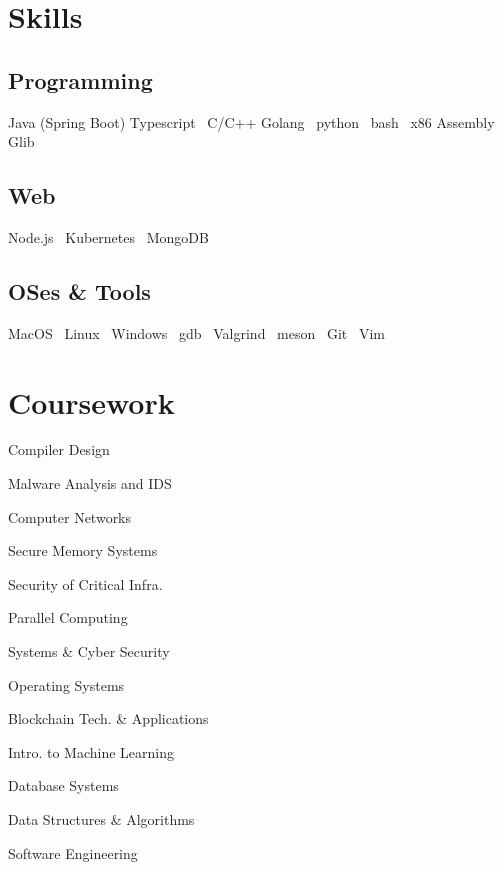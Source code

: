 \documentclass[a4paper]{deedy-resume-reversed}
\begin{document}
\begin{minipage}[t]{0.33\textwidth}
\section{Skills}
\subsection{Programming}
    Java (Spring Boot) \textbullet Typescript  \textbullet\ C/C++ \textbullet Golang \textbullet\
    python \textbullet\ bash  \textbullet\ x86 Assembly \textbullet{} Glib
\sectionsep

\subsection{Web}
    Node.js \textbullet\ Kubernetes \textbullet\ MongoDB
\sectionsep

    \subsection{OSes \& Tools}
    MacOS \textbullet\ Linux \textbullet\ Windows \textbullet\ gdb \textbullet\ Valgrind \textbullet\ meson \textbullet\ Git \textbullet\ Vim
\sectionsep


\section{Coursework}
\vspace{10pt} %
\begin{tightemize}
\item Compiler Design
\item Malware Analysis and IDS
\item Computer Networks
\item Secure Memory Systems
\item Security of Critical Infra.
\item Parallel Computing
\item Systems \& Cyber Security
\item Operating Systems
\item Blockchain Tech. \& Applications
\item Intro. to Machine Learning
\item Database Systems
\item Data Structures \& Algorithms
\item Software Engineering
\end{tightemize}
\sectionsep


\end{minipage}
\end{document}
